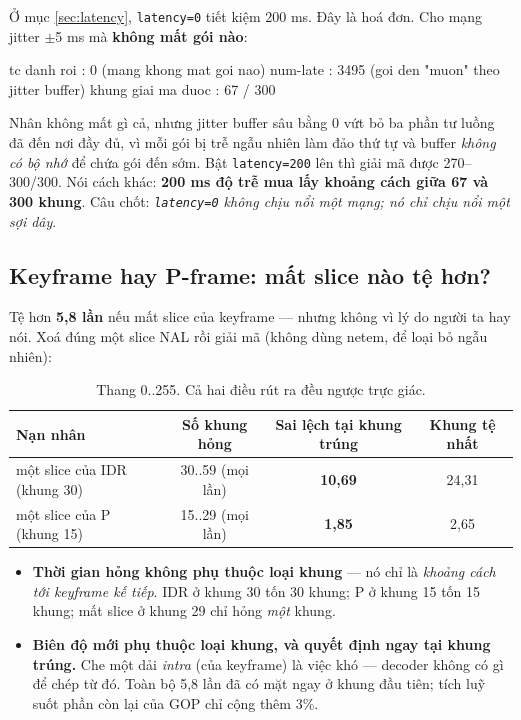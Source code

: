 \documentclass[12pt]{ai_conquer2026}
\begin{document}
Ở mục \ref{sec:latency}, \texttt{latency=0} tiết kiệm 200 ms. Đây là hoá đơn. Cho
mạng jitter $\pm$5 ms mà \textbf{không mất gói nào}:

\begin{aivnoutputbox}
tc danh roi        : 0        (mang khong mat goi nao)
num-late           : 3495     (goi den "muon" theo jitter buffer)
khung giai ma duoc : 67 / 300
\end{aivnoutputbox}

Nhân không mất gì cả, nhưng jitter buffer sâu bằng 0 vứt bỏ ba phần tư luồng đã
đến nơi đầy đủ, vì mỗi gói bị trễ ngẫu nhiên làm đảo thứ tự và buffer \emph{không
có bộ nhớ} để chứa gói đến sớm. Bật \texttt{latency=200} lên thì giải mã được
270--300/300. Nói cách khác: \textbf{200 ms độ trễ mua lấy khoảng cách giữa 67 và
300 khung}. Câu chốt: \emph{\texttt{latency=0} không chịu nổi một mạng; nó chỉ
chịu nổi một sợi dây}.

\subsection{Keyframe hay P-frame: mất slice nào tệ hơn?}

Tệ hơn \textbf{5,8 lần} nếu mất slice của keyframe --- nhưng không vì lý do người
ta hay nói. Xoá đúng một slice NAL rồi giải mã (không dùng netem, để loại bỏ ngẫu
nhiên):

\begin{table}[h]
\centering
\begin{tabular}{@{}lccc@{}}
\toprule
Nạn nhân & Số khung hỏng & Sai lệch tại khung trúng & Khung tệ nhất \\
\midrule
một slice của IDR (khung 30) & 30..59 (mọi lần) & \textbf{10,69} & 24,31 \\
một slice của P (khung 15)   & 15..29 (mọi lần) & \textbf{1,85}  & 2,65 \\
\bottomrule
\end{tabular}
\caption{Thang 0..255. Cả hai điều rút ra đều ngược trực giác.}
\end{table}

\begin{itemize}
\item \textbf{Thời gian hỏng không phụ thuộc loại khung} --- nó chỉ là
      \emph{khoảng cách tới keyframe kế tiếp}. IDR ở khung 30 tốn 30 khung; P ở
      khung 15 tốn 15 khung; mất slice ở khung 29 chỉ hỏng \emph{một} khung.
\item \textbf{Biên độ mới phụ thuộc loại khung, và quyết định ngay tại khung
      trúng.} Che một dải \emph{intra} (của keyframe) là việc khó --- decoder
      không có gì để chép từ đó. Toàn bộ 5,8 lần đã có mặt ngay ở khung đầu tiên;
      tích luỹ suốt phần còn lại của GOP chỉ cộng thêm 3\%.
\end{itemize}
\end{document}
